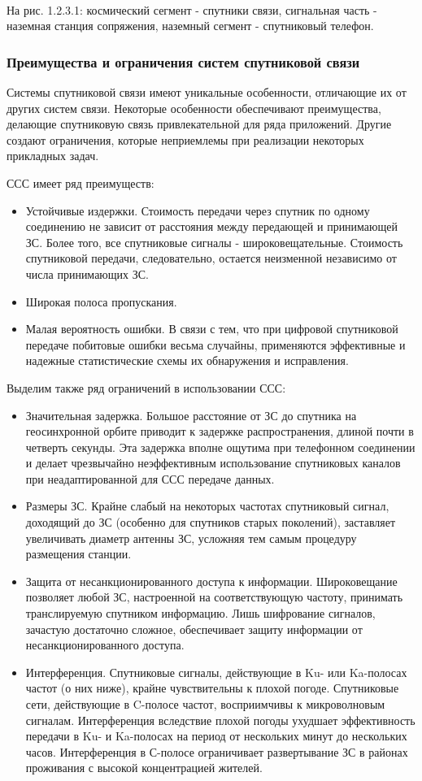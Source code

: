 \documentclass[a4paper]{report}
\begin{document}
~

На рис. 1.2.3.1: космический сегмент - спутники связи, сигнальная часть - наземная станция сопряжения, наземный сегмент - спутниковый телефон.

\subsubsection{Преимущества и ограничения систем спутниковой связи}
Системы спутниковой связи имеют уникальные особенности, отличающие их от других систем связи. Некоторые особенности обеспечивают преимущества, делающие спутниковую связь привлекательной для ряда приложений. Другие создают ограничения, которые неприемлемы при реализации некоторых прикладных задач.

ССС имеет ряд преимуществ:
\begin{itemize}
\item Устойчивые издержки. Стоимость передачи через спутник по одному соединению не зависит от расстояния между передающей и принимающей ЗС. Более того, все спутниковые сигналы - широковещательные. Стоимость спутниковой передачи, следовательно, остается неизменной независимо от числа принимающих ЗС.
\item Широкая полоса пропускания.
\item Малая вероятность ошибки. В связи с тем, что при цифровой спутниковой передаче побитовые ошибки весьма случайны, применяются эффективные и надежные статистические схемы их обнаружения и исправления.
\end{itemize}

Выделим также ряд ограничений в использовании ССС:

\begin{itemize}
\item Значительная задержка. Большое расстояние от ЗС до спутника на геосинхронной орбите приводит к задержке распространения, длиной почти в четверть секунды. Эта задержка вполне ощутима при телефонном соединении и делает чрезвычайно неэффективным использование спутниковых каналов при неадаптированной для ССС передаче данных.
\item Размеры ЗС. Крайне слабый на некоторых частотах спутниковый сигнал, доходящий до ЗС (особенно для спутников старых поколений), заставляет увеличивать диаметр антенны ЗС, усложняя тем самым процедуру размещения станции.
\item Защита от несанкционированного доступа к информации. Широковещание позволяет любой ЗС, настроенной на соответствующую частоту, принимать транслируемую спутником информацию. Лишь шифрование сигналов, зачастую достаточно сложное, обеспечивает защиту информации от несанкционированного доступа.
\item Интерференция. Спутниковые сигналы, действующие в Ku- или Ka-полосах частот (о них ниже), крайне чувствительны к плохой погоде. Спутниковые сети, действующие в C-полосе частот, восприимчивы к микроволновым сигналам. Интерференция вследствие плохой погоды ухудшает эффективность передачи в Ku- и Ka-полосах на период от нескольких минут до нескольких часов. Интерференция в С-полосе ограничивает развертывание ЗС в районах проживания с высокой концентрацией жителей.
\end{itemize}
\end{document}
